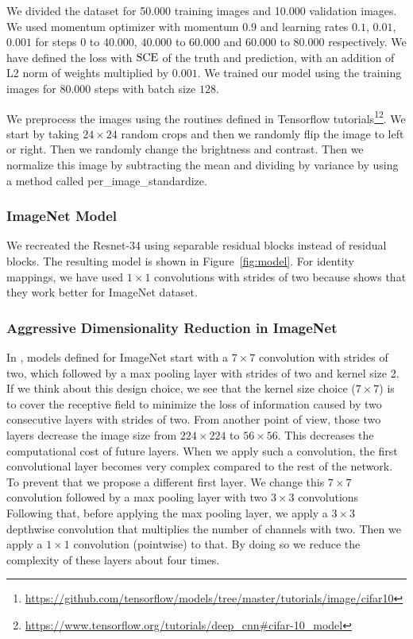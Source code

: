 We divided the dataset for 50.000 training images and 10.000 validation images. We used momentum optimizer with momentum $0.9$ and learning rates $0.1$, $0.01$, $0.001$ for steps $0$ to $40.000$, $40.000$ to $60.000$ and $60.000$ to $80.000$ respectively. We have defined the loss with $\textrm{SCE}$ of the truth and prediction, with an addition of L2 norm of weights multiplied by $0.001$. We trained our model using the training images for $80.000$ steps with batch size $128$. 

We preprocess the images using the routines defined in Tensorflow tutorials\footnote{\url{https://github.com/tensorflow/models/tree/master/tutorials/image/cifar10}}\footnote{\url{https://www.tensorflow.org/tutorials/deep\_cnn\#cifar-10\_model}}. We start by taking $24 \times 24$ random crops and then we randomly flip the image to left or right. Then we randomly change the brightness and contrast. Then we normalize this image by subtracting the mean and dividing by variance by using a method called per\_image\_standardize.


\subsubsection{ImageNet Model}
We recreated the Resnet-34 using separable residual blocks instead of residual blocks. The resulting model is shown in Figure~\ref{fig:model}. For identity mappings, we have used $1 \times 1$ convolutions with strides of two because \cite{He:2015aa} shows that they work better for ImageNet dataset.

\subsubsection{Aggressive Dimensionality Reduction in ImageNet}
In \cite{He:2015aa}, models defined for ImageNet start with a $7 \times 7$ convolution with strides of two, which followed by a max pooling layer with strides of two and kernel size 2. If we think about this design choice, we see that the kernel size choice ($7 \times 7$) is to cover the receptive field to minimize the loss of information caused by two consecutive layers with strides of two. From another point of view, those two layers decrease the image size from $224 \times 224$ to $56 \times 56$. This decreases the computational cost of future layers. When we apply such a convolution, the first convolutional layer becomes very complex compared to the rest of the network. To prevent that we propose a different first layer. We change this $7 \times 7$ convolution followed by a max pooling layer with two $3 \times 3$ convolutions 
Following that, before applying the max pooling layer, we apply a $3 \times 3$ depthwise convolution that multiplies the number of channels with two. Then we apply a $1 \times 1$ convolution (pointwise) to that.  By doing so we reduce the complexity of these layers about four times. 

